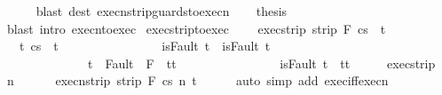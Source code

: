 \begin{isabellebody}
\ \ \ \ \isamarkupfalse%
\ {\isacharparenleft}blast\ dest{\isacharcolon}\ execn{\isacharunderscore}strip{\isacharunderscore}guards{\isacharunderscore}to{\isacharunderscore}execn{\isacharparenright}\isanewline
\ \ \isamarkupfalse%
\ {\isacharquery}thesis\isanewline
\ \ \ \ \isamarkupfalse%
\ {\isacharparenleft}blast\ intro{\isacharcolon}\ execn{\isacharunderscore}to{\isacharunderscore}exec{\isacharparenright}\isanewline
{}\isamarkupfalse%
%
\endisatagproof
{\isafoldproof}%
%
\isadelimproof
\isanewline
%
\endisadelimproof
\isanewline
{}\isamarkupfalse%
\ exec{\isacharunderscore}strip{\isacharunderscore}to{\isacharunderscore}exec{\isacharcolon}\ \isanewline
\ \ \ exec{\isacharunderscore}strip{\isacharcolon}\ {\isachardoublequoteopen}strip\ F\ {\isasymGamma}{\isasymturnstile}{\isasymlangle}c{\isacharcomma}s{\isasymrangle}\ {\isasymRightarrow}\ t{\isachardoublequoteclose}\ \isanewline
\ \ \ {\isachardoublequoteopen}{\isasymexists}t{\isacharprime}{\isachardot}\ {\isasymGamma}{\isasymturnstile}{\isasymlangle}c{\isacharcomma}s{\isasymrangle}\ {\isasymRightarrow}\ t{\isacharprime}\ {\isasymand}\ \isanewline
\ \ \ \ \ \ \ \ \ \ \ \ \ \ {\isacharparenleft}isFault\ t\ {\isasymlongrightarrow}\ isFault\ t{\isacharprime}{\isacharparenright}\ {\isasymand}\ \isanewline
\ \ \ \ \ \ \ \ \ \ \ \ \ \ {\isacharparenleft}t{\isacharprime}\ {\isasymin}\ Fault\ {\isacharbackquote}\ {\isacharparenleft}{\isacharminus}F{\isacharparenright}\ {\isasymlongrightarrow}\ t{\isacharprime}{\isacharequal}t{\isacharparenright}\ {\isasymand}\isanewline
\ \ \ \ \ \ \ \ \ \ \ \ \ \ {\isacharparenleft}{\isasymnot}\ isFault\ t{\isacharprime}\ {\isasymlongrightarrow}\ t{\isacharprime}{\isacharequal}t{\isacharparenright}{\isachardoublequoteclose}\isanewline
%
\isadelimproof
%
\endisadelimproof
%
\isatagproof
{}\isamarkupfalse%
\ {\isacharminus}\isanewline
\ \ \isamarkupfalse%
\ exec{\isacharunderscore}strip\ \isamarkupfalse%
\ n\ \ \isanewline
\ \ \ \ execn{\isacharunderscore}strip{\isacharcolon}\ {\isachardoublequoteopen}strip\ F\ {\isasymGamma}{\isasymturnstile}{\isasymlangle}c{\isacharcomma}s{\isasymrangle}\ {\isacharequal}n{\isasymRightarrow}\ t{\isachardoublequoteclose}\isanewline
\ \ \ \ \isamarkupfalse%
\ {\isacharparenleft}auto\ simp\ add{\isacharcolon}\ exec{\isacharunderscore}iff{\isacharunderscore}execn{\isacharparenright}\isanewline
\ \ \isamarkupfalse%
\ \isamarkupfalse%

\end{isabellebody}
